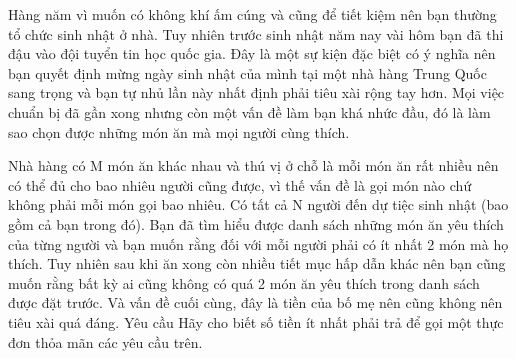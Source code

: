Hàng năm vì muốn có không khí ấm cúng và cũng để tiết kiệm nên bạn thường tổ chức sinh nhật ở nhà. Tuy nhiên trước sinh nhật năm nay vài hôm bạn đã thi đậu vào đội tuyển tin học quốc gia. Đây là một sự kiện đặc biệt có ý nghĩa nên bạn quyết định mừng ngày sinh nhật của mình tại một nhà hàng Trung Quốc sang trọng và bạn tự nhủ lần này nhất định phải tiêu xài rộng tay hơn. Mọi việc chuẩn bị đã gần xong nhưng còn một vấn đề làm bạn khá nhức đầu, đó là làm sao chọn được những món ăn mà mọi người cùng thích.  

   Nhà hàng có M món ăn khác nhau và thú vị ở chỗ là mỗi món ăn rất nhiều nên có thể đủ cho bao nhiêu người cũng được, vì thế vấn đề là gọi món nào chứ không phải mỗi món gọi bao nhiêu. Có tất cả N người đến dự tiệc sinh nhật (bao gồm cả bạn trong đó). Bạn đã tìm hiểu được danh sách những món ăn yêu thích của từng người và bạn muốn rằng đối với mỗi người phải có ít nhất 2 món mà họ thích. Tuy nhiên sau khi ăn xong còn nhiều tiết mục hấp dẫn khác nên bạn cũng muốn rằng bất kỳ ai cũng không có quá 2 món ăn yêu thích trong danh sách được đặt trước. Và vấn đề cuối cùng, đây là tiền của bố mẹ nên cũng không nên tiêu xài quá đáng.
Yêu cầu
Hãy cho biết số tiền ít nhất phải trả để gọi một thực đơn thỏa mãn các yêu cầu trên.